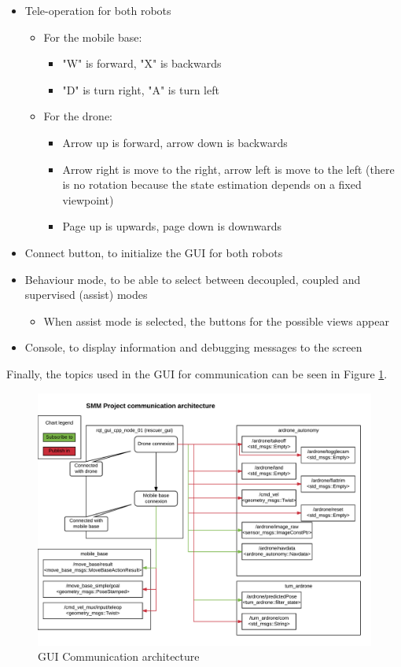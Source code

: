 \documentclass[11pt,a4paper]{article}
\begin{document}
\begin{itemize}
	\begin{itemize}
		\item Tele-operation for both robots
		\begin{itemize}
			\item For the mobile base:
			\begin{itemize}
				\item "W" is forward, "X" is backwards
				\item "D" is turn right, "A" is turn left			
			\end{itemize}
			\item For the drone:
			\begin{itemize}
				\item Arrow up is forward, arrow down is backwards
				\item Arrow right is move to the right, arrow left is move to the left (there is no rotation 
				because the state estimation depends on a fixed viewpoint)
				\item Page up is upwards, page down is downwards
			\end{itemize}	
		\end{itemize}
		\item Connect button, to initialize the GUI for both robots
		\item Behaviour mode, to be able to select between decoupled, coupled and supervised (assist) modes	
		\begin{itemize}
			\item When assist mode is selected, the buttons for the possible views appear
		\end{itemize}		
		\item Console, to display information and debugging messages to the screen	
	\end{itemize}
\end{itemize}

Finally, the topics used in the GUI for communication can be seen in Figure \ref{fig:guicomm}.




\begin{figure}[ht]	
\centering
\includegraphics[width=12.7cm]{communicationArchitecture.png}
\caption{GUI Communication architecture}
\label{fig:guicomm}
\end{figure}
\clearpage
\end{document}
